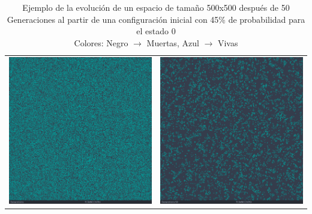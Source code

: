 \documentclass[]{article}
\begin{document}
\begin{landscape}
			\newpage
			\hfill \break
			\hfill \break
			\hfill \break
			\hfill \break
			\hfill \break
			\hfill \break
			\hfill \break
			\begin{table}[!h]
				\centering
				\begin{tabular}{c c}
					\includegraphics[width=11cm]{Imagenes/Evolucion_500x500_0Gen.png} &
					\includegraphics[width=11cm]{Imagenes/Evolucion_500x500_50Gen.png}
				\end{tabular}
				\caption{Ejemplo de la evolución de un espacio de tamaño 500x500 después de 50 Generaciones al partir de una configuración inicial con 45\% de probabilidad para el estado 0 \\ Colores: Negro $\rightarrow$ Muertas, Azul $\rightarrow$ Vivas}
				\label{Evolucion_500x500}
			\end{table}
		

\end{landscape}
\end{document}
